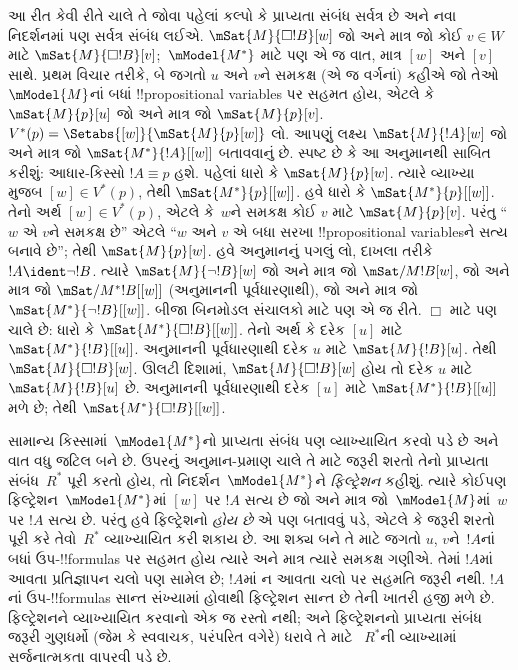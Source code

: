 \documentclass[../../../include/open-logic-section]{subfiles}
\begin{document}
આ રીત કેવી રીતે ચાલે તે જોવા પહેલાં કલ્પો કે પ્રાપ્યતા સંબંધ
સર્વત્ર છે અને નવા નિદર્શનમાં પણ સર્વત્ર સંબંધ લઈએ.
$\mSat{M}{\Box !B}[w]$ જો અને માત્ર જો કોઈ
$v \in W$ માટે $\mSat{M}{\Box !B}[v]$;~$\mModel{M^*}$ માટે પણ
એ જ વાત, માત્ર $[w]$ અને $[v]$ સાથે.
પ્રથમ વિચાર તરીકે, બે જગતો $u$ અને $v$ને સમકક્ષ (એ જ વર્ગનાં)
કહીએ જો તેઓ~$\mModel{M}$નાં બધાં !!{propositional variable}s
પર સહમત હોય, એટલે કે $\mSat{M}{p}[u]$ જો અને માત્ર જો
$\mSat{M}{p}[v]$. $V^*(p) = \Setabs{[w]}{\mSat{M}{p}[w]}$ લો.
આપણું લક્ષ્ય $\mSat{M}{!A}[w]$ જો અને માત્ર જો
$\mSat{M^*}{!A}[{[w]}]$ બતાવવાનું છે. સ્પષ્ટ છે કે આ અનુમાનથી
સાબિત કરીશું: આધાર-કિસ્સો $!A \equiv p$ હશે. પહેલાં ધારો કે
$\mSat{M}{p}[w]$. ત્યારે વ્યાખ્યા મુજબ $[w] \in V^*(p)$,
તેથી $\mSat{M^*}{p}[{[w]}]$.
હવે ધારો કે $\mSat{M^*}{p}[{[w]}]$. તેનો અર્થ
$[w] \in V^*(p)$, એટલે કે~$w$ને સમકક્ષ કોઈ $v$ માટે
$\mSat{M}{p}[v]$. પરંતુ ``$w$ એ $v$ને સમકક્ષ છે'' એટલે
``$w$ અને $v$ એ બધા સરખા !!{propositional variable}sને સત્ય
બનાવે છે''; તેથી $\mSat{M}{p}[w]$. હવે અનુમાનનું પગલું લો,
દાખલા તરીકે $!A \ident \lnot !B$. ત્યારે
$\mSat{M}{\lnot !B}[w]$ જો અને માત્ર જો $\mSat/{M}{!B}[w]$,
જો અને માત્ર જો $\mSat/{M^*}{!B}[{[w]}]$ (અનુમાનની
પૂર્વધારણાથી), જો અને માત્ર જો
$\mSat{M^*}{\lnot !B}[{[w]}]$. બીજા બિનમોડલ સંચાલકો માટે પણ
એ જ રીતે. $\Box$ માટે પણ ચાલે છે: ધારો કે
$\mSat{M^*}{\Box !B}[{[w]}]$. તેનો અર્થ કે દરેક $[u]$ માટે
$\mSat{M^*}{!B}[{[u]}]$. અનુમાનની પૂર્વધારણાથી દરેક $u$ માટે
$\mSat{M}{!B}[u]$. તેથી $\mSat{M}{\Box !B}[w]$.
ઊલટી દિશામાં, $\mSat{M}{\Box !B}[w]$ હોય તો દરેક $u$ માટે
$\mSat{M}{!B}[u]$ છે. અનુમાનની પૂર્વધારણાથી દરેક $[u]$ માટે
$\mSat{M^*}{!B}[{[u]}]$ મળે છે; તેથી
$\mSat{M^*}{\Box !B}[{[w]}]$.


સામાન્ય કિસ્સામાં~$\mModel{M^*}$નો પ્રાપ્યતા સંબંધ પણ વ્યાખ્યાયિત
કરવો પડે છે અને વાત વધુ જટિલ બને છે. ઉપરનું અનુમાન-પ્રમાણ ચાલે
તે માટે જરૂરી શરતો તેનો પ્રાપ્યતા સંબંધ~$R^*$ પૂરી કરતો હોય,
તો નિદર્શન~$\mModel{M^*}$ને \emph{ફિલ્ટ્રેશન} કહીશું.
ત્યારે કોઈપણ ફિલ્ટ્રેશન~$\mModel{M^*}$માં $[w]$ પર $!A$
સત્ય છે જો અને માત્ર જો~$\mModel{M}$માં~$w$ પર $!A$ સત્ય છે.
પરંતુ હવે ફિલ્ટ્રેશનો \emph{હોય છે} એ પણ બતાવવું પડે, એટલે કે
જરૂરી શરતો પૂરી કરે તેવો~$R^*$ વ્યાખ્યાયિત કરી શકાય છે.
આ શક્ય બને તે માટે જગતો $u$, $v$ને~$!A$નાં બધાં
ઉપ-!!{formula}s પર સહમત હોય ત્યારે અને માત્ર ત્યારે સમકક્ષ ગણીએ.
તેમાં $!A$માં આવતા પ્રતિજ્ઞાપન ચલો પણ સામેલ છે; $!A$માં ન આવતા
ચલો પર સહમતિ જરૂરી નથી. $!A$નાં ઉપ-!!{formula}s સાન્ત સંખ્યામાં હોવાથી
ફિલ્ટ્રેશન સાન્ત છે તેની ખાતરી હજી મળે છે. ફિલ્ટ્રેશનને વ્યાખ્યાયિત
કરવાનો એક જ રસ્તો નથી; અને ફિલ્ટ્રેશનનો પ્રાપ્યતા સંબંધ જરૂરી
ગુણધર્મો (જેમ કે સ્વવાચક, પરંપરિત વગેરે) ધરાવે તે માટે
~$R^*$ની વ્યાખ્યામાં સર્જનાત્મકતા વાપરવી પડે છે.
\end{document}
